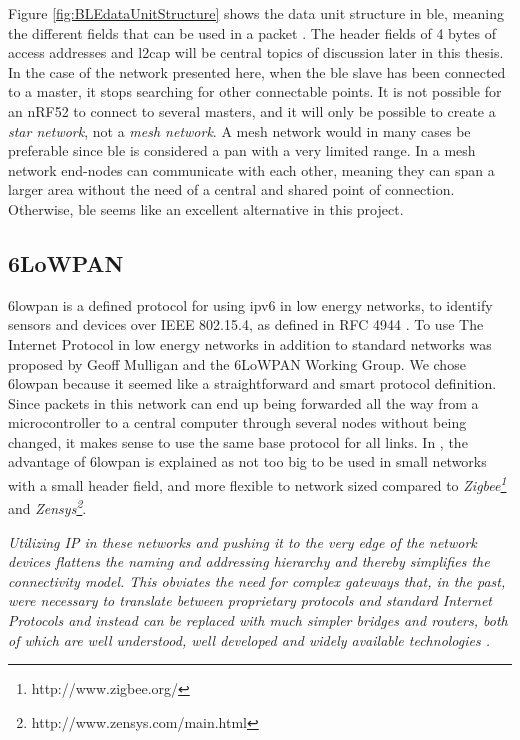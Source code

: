 \noindent Figure \ref{fig:BLEdataUnitStructure} shows the data unit structure in \gls{ble}, meaning the different fields that can be used in a packet \cite{gomez2012overview}. The header fields of 4 \glspl{byte} of access addresses and \gls{l2cap} will be central topics of discussion later in this thesis. In the case of the network presented here, when the \gls{ble} slave has been connected to a master, it stops searching for other connectable points. It is not possible for an \gls{nRF52} to connect to several masters, and it will only be possible to create a \textit{star network}, not a \textit{mesh network}. A mesh network would in many cases be preferable since \gls{ble} is considered a \gls{pan} with a very limited range. In a mesh network end-nodes can communicate with each other, meaning they can span a larger area without the need of a central and shared point of connection. Otherwise, \gls{ble} seems like an excellent alternative in this project. 


\subsection{6LoWPAN}

\noindent \gls{6lowpan} is a defined protocol for using \gls{ipv6} in low energy networks, to identify sensors and devices over  IEEE 802.15.4, as defined in RFC 4944 \cite{montenegro2007transmission}. To use The Internet Protocol in low energy networks in addition to standard networks was proposed by Geoff Mulligan and the 6LoWPAN Working Group\cite{mulligan20076lowpan}. We chose \gls{6lowpan} because it seemed like a straightforward and smart protocol definition. Since packets in this network can end up being forwarded all the way from a \gls{microcontroller} to a central computer through several nodes without being changed, it makes sense to use the same base protocol for all links. In \cite{mulligan20076lowpan}, the advantage of \gls{6lowpan} is explained as not too big to be used in small networks with a small header field, and more flexible to network sized compared to \textit{Zigbee\footnote{http://www.zigbee.org/}} and \textit{Zensys\footnote{http://www.zensys.com/main.html}}. 

\noindent\textit{Utilizing IP  in these networks and pushing it to the very edge of the network devices flattens the naming and addressing hierarchy and  thereby  simplifies  the  connectivity  model. This obviates the need  for  complex  gateways  that,  in  the  past,  were  necessary  to translate   between   proprietary   protocols   and   standard   Internet Protocols and instead can be replaced with much simpler bridges and  routers,  both  of  which  are  well  understood, well  developed and  widely  available  technologies \cite{mulligan20076lowpan}.}


